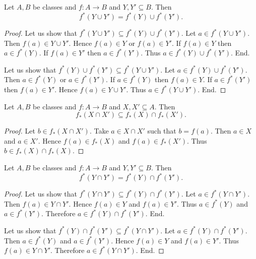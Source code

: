 \documentclass[../../set-theory/set-theory.tex]{subfiles}
\begin{document}
  \begin{forthel}
    \begin{proposition}
      Let $A, B$ be classes and $f : A \to B$ and $Y, Y' \subseteq B$.
      Then \[ f^{*}(Y \cup Y') = f^{*}(Y) \cup f^{*}(Y'). \]
    \end{proposition}
    \begin{proof}
      Let us show that $f^{*}(Y \cup Y') \subseteq f^{*}(Y) \cup f^{*}(Y')$.
        Let $a \in f^{*}(Y \cup Y')$.
        Then $f(a) \in Y \cup Y'$.
        Hence $f(a) \in Y$ or $f(a) \in Y'$.
        If $f(a) \in Y$ then $a \in f^{*}(Y)$.
        If $f(a) \in Y'$ then $a \in f^{*}(Y')$.
        Thus $a \in f^{*}(Y) \cup f^{*}(Y')$.
      End.

      Let us show that $f^{*}(Y) \cup f^{*}(Y') \subseteq f^{*}(Y \cup Y')$.
        Let $a \in f^{*}(Y) \cup f^{*}(Y')$.
        Then $a \in f^{*}(Y)$ or $a \in f^{*}(Y')$.
        If $a \in f^{*}(Y)$ then $f(a) \in Y$.
        If $a \in f^{*}(Y')$ then $f(a) \in Y'$.
        Hence $f(a) \in Y \cup Y'$.
        Thus $a \in f^{*}(Y \cup Y')$.
      End.
    \end{proof}
  \end{forthel}

  \begin{forthel}
    \begin{proposition}
      Let $A, B$ be classes and $f : A \to B$ and $X, X' \subseteq A$.
      Then \[ f_{*}(X \cap X') \subseteq f_{*}(X) \cap f_{*}(X'). \]
    \end{proposition}
    \begin{proof}
      Let $b \in f_{*}(X \cap X')$.
      Take $a \in X \cap X'$ such that $b = f(a)$.
      Then $a \in X$ and $a \in X'$.
      Hence $f(a) \in f_{*}(X)$ and $f(a) \in f_{*}(X')$.
      Thus $b \in f_{*}(X) \cap f_{*}(X)$.
    \end{proof}
  \end{forthel}

  \begin{forthel}
    \begin{proposition}
      Let $A, B$ be classes and $f : A \to B$ and $Y, Y' \subseteq B$.
      Then \[ f^{*}(Y \cap Y') = f^{*}(Y) \cap f^{*}(Y'). \]
    \end{proposition}
    \begin{proof}
      Let us show that $f^{*}(Y \cap Y') \subseteq f^{*}(Y) \cap f^{*}(Y')$.
        Let $a \in f^{*}(Y \cap Y')$.
        Then $f(a) \in Y \cap Y'$.
        Hence $f(a) \in Y$ and $f(a) \in Y'$.
        Thus $a \in f^{*}(Y)$ and $a \in f^{*}(Y')$.
        Therefore $a \in f^{*}(Y) \cap f^{*}(Y')$.
      End.

      Let us show that $f^{*}(Y) \cap f^{*}(Y') \subseteq f^{*}(Y \cap Y')$.
        Let $a \in f^{*}(Y) \cap f^{*}(Y')$.
        Then $a \in f^{*}(Y)$ and $a \in f^{*}(Y')$.
        Hence $f(a) \in Y$ and $f(a) \in Y'$.
        Thus $f(a) \in Y \cap Y'$.
        Therefore $a \in f^{*}(Y \cap Y')$.
      End.
    \end{proof}
  \end{forthel}
\end{document}
